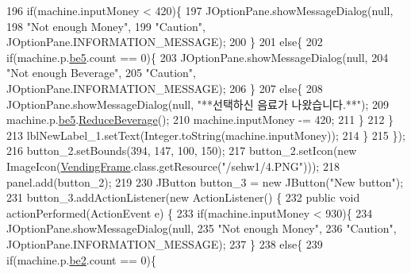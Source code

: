 \begin{DoxyCode}
196                 \textcolor{keywordflow}{if}(machine.inputMoney < 420)\{
197                     JOptionPane.showMessageDialog(null,
198                             \textcolor{stringliteral}{"Not enough Money"}, 
199                             \textcolor{stringliteral}{"Caution"}, JOptionPane.INFORMATION\_MESSAGE);
200                 \}
201                 \textcolor{keywordflow}{else}\{
202                     \textcolor{keywordflow}{if}(machine.p.\hyperlink{classsehw1_1_1product_a3818d4dbbdcf52983e2638206c51cc59}{be5}.count == 0)\{
203                         JOptionPane.showMessageDialog(null,
204                                 \textcolor{stringliteral}{"Not enough Beverage"}, 
205                                 \textcolor{stringliteral}{"Caution"}, JOptionPane.INFORMATION\_MESSAGE);
206                     \}
207                     \textcolor{keywordflow}{else}\{
208                         JOptionPane.showMessageDialog(null, \textcolor{stringliteral}{"**선택하신 음료가 나왔습니다.**"});
209                         machine.p.\hyperlink{classsehw1_1_1product_a3818d4dbbdcf52983e2638206c51cc59}{be5}.\hyperlink{classsehw1_1_1beverage_ad2c40378698fb6c31c8f02bddb2a4e29}{ReduceBeverage}();
210                         machine.inputMoney -= 420;
211                     \}
212                 \}
213                 lblNewLabel\_1.setText(Integer.toString(machine.inputMoney));
214             \}
215         \});
216         button\_2.setBounds(394, 147, 100, 150);
217         button\_2.setIcon(\textcolor{keyword}{new} ImageIcon(\hyperlink{classsehw1_1_1_vending_frame_a82f3d8fe653c04d594b0a46e751328a0}{VendingFrame}.class.getResource(\textcolor{stringliteral}{"/sehw1/4.PNG"})));
218         panel.add(button\_2);
219         
230         JButton button\_3 = \textcolor{keyword}{new} JButton(\textcolor{stringliteral}{"New button"});
231         button\_3.addActionListener(\textcolor{keyword}{new} ActionListener() \{
232             \textcolor{keyword}{public} \textcolor{keywordtype}{void} actionPerformed(ActionEvent e) \{
233                 \textcolor{keywordflow}{if}(machine.inputMoney < 930)\{
234                     JOptionPane.showMessageDialog(null,
235                             \textcolor{stringliteral}{"Not enough Money"}, 
236                             \textcolor{stringliteral}{"Caution"}, JOptionPane.INFORMATION\_MESSAGE);
237                 \}
238                 \textcolor{keywordflow}{else}\{
239                     \textcolor{keywordflow}{if}(machine.p.\hyperlink{classsehw1_1_1product_a970d42cefd2a8aba360fbc62e1dfcd6f}{be2}.count == 0)\{

\end{DoxyCode}
